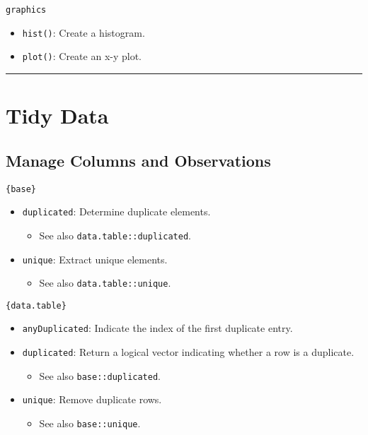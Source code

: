\documentclass[]{book}
\providecommand{\tightlist}{%
  \setlength{\itemsep}{0pt}\setlength{\parskip}{0pt}}
\begin{document}
\texttt{graphics}

\begin{itemize}
\tightlist
\item
  \texttt{hist()}: Create a histogram.
\item
  \texttt{plot()}: Create an x-y plot.
\end{itemize}

\begin{center}\rule{0.5\linewidth}{\linethickness}\end{center}

\hypertarget{tidy-data}{%
\section{Tidy Data}\label{tidy-data}}

\hypertarget{manage-columns-and-observations}{%
\subsection{Manage Columns and Observations}\label{manage-columns-and-observations}}

\texttt{\{base\}}

\begin{itemize}
\tightlist
\item
  \texttt{duplicated}: Determine duplicate elements.

  \begin{itemize}
  \tightlist
  \item
    See also \texttt{data.table::duplicated}.
  \end{itemize}
\item
  \texttt{unique}: Extract unique elements.

  \begin{itemize}
  \tightlist
  \item
    See also \texttt{data.table::unique}.
  \end{itemize}
\end{itemize}

\texttt{\{data.table\}}

\begin{itemize}
\tightlist
\item
  \texttt{anyDuplicated}: Indicate the index of the first duplicate entry.
\item
  \texttt{duplicated}: Return a logical vector indicating whether a row is a duplicate.

  \begin{itemize}
  \tightlist
  \item
    See also \texttt{base::duplicated}.
  \end{itemize}
\item
  \texttt{unique}: Remove duplicate rows.

  \begin{itemize}
  \tightlist
  \item
    See also \texttt{base::unique}.
  \end{itemize}
\end{itemize}
\end{document}
